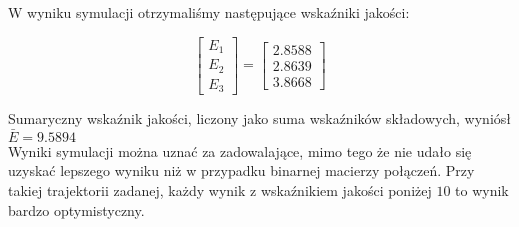 W wyniku symulacji otrzymaliśmy następujące wskaźniki jakości:

\[
\begin{bmatrix}
    E_{\mathrm{1}} \\
    E_{\mathrm{2}} \\
    E_{\mathrm{3}} 
\end{bmatrix}
= 
\begin{bmatrix}
    \num{2.8588} \\
    \num{2.8639} \\
    \num{3.8668}
\end{bmatrix}
\]

Sumaryczny wskaźnik jakości, liczony jako suma wskaźników składowych, 
wyniósł $\bar{E} = \num{9.5894}$\\

Wyniki symulacji można uznać za zadowalające, mimo tego że nie udało się uzyskać
lepszego wyniku niż w przypadku binarnej macierzy połączeń. Przy takiej trajektorii 
zadanej, każdy wynik z wskaźnikiem jakości poniżej $\num{10}$ to wynik bardzo optymistyczny.
 

